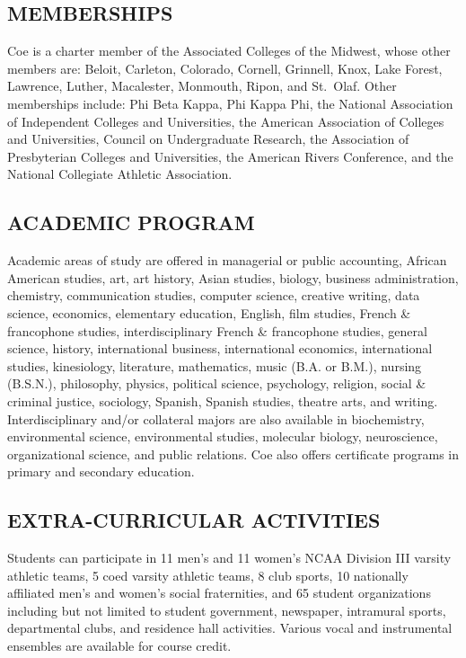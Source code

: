 \documentclass[
  letterpaper,
]{scrbook}
\begin{document}
\subsection{MEMBERSHIPS}\label{memberships}

Coe is a charter member of the Associated Colleges of the Midwest, whose
other members are: Beloit, Carleton, Colorado, Cornell, Grinnell, Knox,
Lake Forest, Lawrence, Luther, Macalester, Monmouth, Ripon, and
St.~Olaf. Other memberships include: Phi Beta Kappa, Phi Kappa Phi, the
National Association of Independent Colleges and Universities, the
American Association of Colleges and Universities, Council on
Undergraduate Research, the Association of Presbyterian Colleges and
Universities, the American Rivers Conference, and the National
Collegiate Athletic Association.

\subsection{ACADEMIC PROGRAM}\label{academic-program}

Academic areas of study are offered in managerial or public accounting,
African American studies, art, art history, Asian studies, biology,
business administration, chemistry, communication studies, computer
science, creative writing, data science, economics, elementary
education, English, film studies, French \& francophone studies,
interdisciplinary French \& francophone studies, general science,
history, international business, international economics, international
studies, kinesiology, literature, mathematics, music (B.A. or B.M.),
nursing (B.S.N.), philosophy, physics, political science, psychology,
religion, social \& criminal justice, sociology, Spanish, Spanish
studies, theatre arts, and writing. Interdisciplinary and/or collateral
majors are also available in biochemistry, environmental science,
environmental studies, molecular biology, neuroscience, organizational
science, and public relations. Coe also offers certificate programs in
primary and secondary education.

\subsection{EXTRA-CURRICULAR
ACTIVITIES}\label{extra-curricular-activities}

Students can participate in 11 men's and 11 women's NCAA Division III
varsity athletic teams, 5 coed varsity athletic teams, 8 club sports, 10
nationally affiliated men's and women's social fraternities, and 65
student organizations including but not limited to student government,
newspaper, intramural sports, departmental clubs, and residence hall
activities. Various vocal and instrumental ensembles are available for
course credit.
\end{document}
